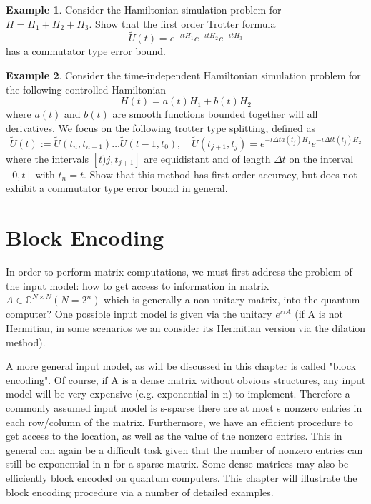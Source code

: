 \documentclass[12pt, oneside]{book}
\theoremstyle{definition}
\theoremstyle{definition}
\newtheorem{example}{Example}[section]
\theoremstyle{remark}
\begin{document}
\begin{example}
    Consider the Hamiltonian simulation problem for $H=H_1+H_2+H_3$. Show that the first order Trotter formula
    \[
    \tilde{U}(t)=e^{-\iota t H_1}e^{-\iota t H_2}e^{-\iota t H_3}
    \]
    has a commutator type error bound.
\end{example}
\begin{example}
    Consider the time-independent Hamiltonian simulation problem for the following controlled Hamiltonian
    \[
    H(t)=a(t)H_1+b(t)H_2
    \]
    where $a(t)$ and $b(t)$ are smooth functions bounded together will all derivatives. We focus on the following trotter type splitting, defined as
    \[
    \tilde{U}(t):=\tilde{U}(t_n,t_{n-1})\ldots \tilde{U}(t-1,t_0), \quad \tilde{U}(t_{j+1},t_j)=e^{-\iota \Delta ta(t_j)H_1}e^{-\iota \Delta tb(t_j)H_2}
    \]
    where the intervals $[t)j,t_{j+1}]$ are equidistant and of length $\Delta t$ on the interval $[0,t]$ with $t_n=t$. Show that this method has first-order accuracy, but does not exhibit a commutator type error bound in general.
\end{example}






\chapter{Block Encoding}
In order to perform matrix computations, we must first address the problem of the input model: how to get access to information in matrix $A\in \mathbb{C}^{N \times N} (N=2^n)$ which is generally a non-unitary matrix, into the quantum computer? One possible input model is given via the unitary $e^{\iota \tau A}$ (if A is not Hermitian, in some scenarios we an consider its Hermitian version via the dilation method).

A more general input model, as will be discussed in this chapter is called "block encoding". Of course, if A is a dense matrix without obvious structures, any input model will be very expensive (e.g. exponential in n) to implement. Therefore a commonly assumed input model is s-sparse there are at most s nonzero entries in each row/column of the matrix. Furthermore, we have an efficient procedure to get access to the location, as well as the value of the nonzero entries. This in general can again be a difficult task given that the number of nonzero entries can still be exponential in n for a sparse matrix. Some dense matrices may also be efficiently block encoded on quantum computers. This chapter will illustrate the block encoding procedure via a number of detailed examples.
\end{document}
